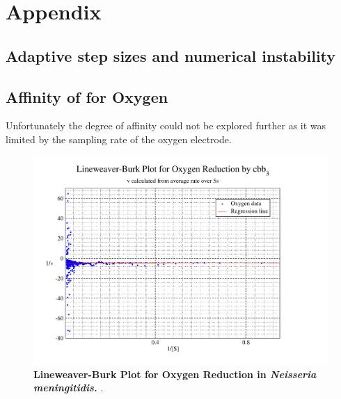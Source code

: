 \appendix
\chapter{Appendix}
\section{Adaptive step sizes and numerical instability}

\section{\texorpdfstring{Affinity of \cbbthree{} for Oxygen}{Affinity of cbb3 for Oxygen}}
Unfortunately the degree of affinity could not be explored further as it was limited by the sampling rate of the oxygen electrode.
\begin{figure}[h]
 \centering
 \includegraphics[width=14cm, trim=2cm 1cm 4cm 1cm]{./appendix/data/lbplot.pdf}
 \caption[{Lineweaver-Burk Plot for Oxygen Reduction in \textit{Neisseria meningitidis}.}]{{\bf Lineweaver-Burk Plot for Oxygen Reduction in \textit{Neisseria meningitidis.}} .
 \label{fig:o2lb}}
\end{figure}

